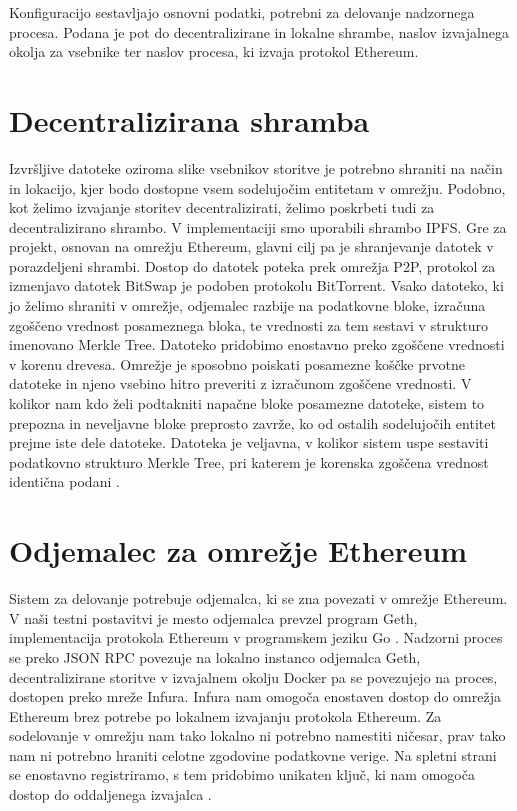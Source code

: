 \documentclass[a4paper, 12pt]{book}
\begin{document}
Konfiguracijo sestavljajo osnovni podatki, potrebni za delovanje nadzornega procesa.
Podana je pot do decentralizirane in lokalne shrambe, naslov izvajalnega okolja za vsebnike ter naslov procesa, ki izvaja protokol Ethereum.

\section{Decentralizirana shramba}
Izvršljive datoteke oziroma slike vsebnikov storitve je potrebno shraniti na način in lokacijo, kjer bodo dostopne vsem sodelujočim entitetam v omrežju.
Podobno, kot želimo izvajanje storitev decentralizirati, želimo poskrbeti tudi za decentralizirano shrambo.
V implementaciji smo uporabili shrambo IPFS.
Gre za projekt, osnovan na omrežju Ethereum, glavni cilj pa je shranjevanje datotek v porazdeljeni shrambi.
Dostop do datotek poteka prek omrežja P2P, protokol za izmenjavo datotek BitSwap je podoben protokolu BitTorrent.
Vsako datoteko, ki jo želimo shraniti v omrežje, odjemalec razbije na podatkovne bloke, izračuna zgoščeno vrednost posameznega bloka, te vrednosti za tem sestavi v strukturo imenovano Merkle Tree.
Datoteko pridobimo enostavno preko zgoščene vrednosti v korenu drevesa.
Omrežje je sposobno poiskati posamezne koščke prvotne datoteke in njeno vsebino hitro preveriti z izračunom zgoščene vrednosti. 
V kolikor nam kdo želi podtakniti napačne bloke posamezne datoteke, sistem to prepozna in neveljavne bloke preprosto zavrže, ko od ostalih sodelujočih entitet prejme iste dele datoteke.
Datoteka je veljavna, v kolikor sistem uspe sestaviti podatkovno strukturo Merkle Tree, pri katerem je korenska zgoščena vrednost identična podani \cite{Ipfs}.

\section{Odjemalec za omrežje Ethereum}
Sistem za delovanje potrebuje odjemalca, ki se zna povezati v omrežje Ethereum.
V naši testni postavitvi je mesto odjemalca prevzel program Geth, implementacija protokola Ethereum v programskem jeziku Go \cite{Geth}.
Nadzorni proces se preko JSON RPC povezuje na lokalno instanco odjemalca Geth, decentralizirane storitve v izvajalnem okolju Docker pa se 
povezujejo na proces, dostopen preko mreže Infura.
Infura nam omogoča enostaven dostop do omrežja Ethereum brez potrebe po lokalnem izvajanju protokola Ethereum.
Za sodelovanje v omrežju nam tako lokalno ni potrebno namestiti ničesar, prav tako nam ni potrebno hraniti
celotne zgodovine podatkovne verige. 
Na spletni strani se enostavno registriramo, s tem pridobimo unikaten ključ, ki nam omogoča dostop do oddaljenega izvajalca \cite{Infura}.
\end{document}
